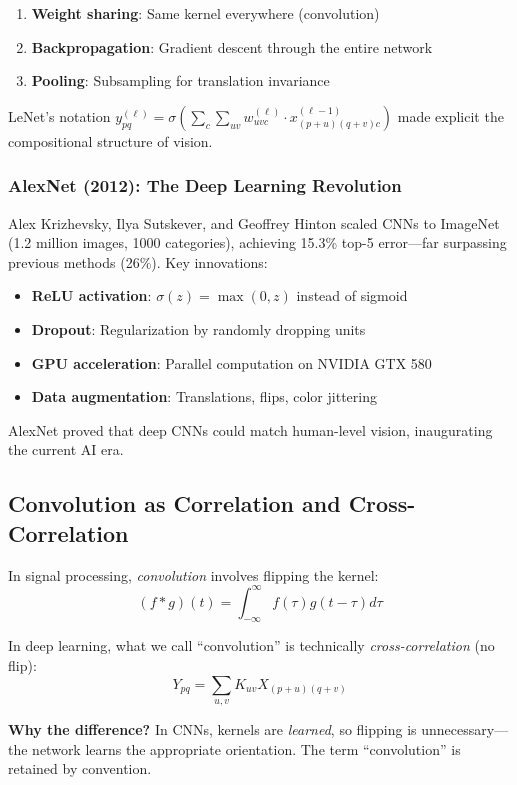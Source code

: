 \begin{enumerate}
	\item \textbf{Weight sharing}: Same kernel everywhere (convolution)
	\item \textbf{Backpropagation}: Gradient descent through the entire network
	\item \textbf{Pooling}: Subsampling for translation invariance
\end{enumerate}

LeNet's notation $y_{pq}^{(\ell)} = \sigma(\sum_c \sum_{uv} w_{uvc}^{(\ell)} \cdot x_{(p+u)(q+v)c}^{(\ell-1)})$ made explicit the compositional structure of vision.

\subsubsection{AlexNet (2012): The Deep Learning Revolution}

Alex Krizhevsky, Ilya Sutskever, and Geoffrey Hinton scaled CNNs to ImageNet (1.2 million images, 1000 categories), achieving 15.3\% top-5 error---far surpassing previous methods (26\%). Key innovations:

\begin{itemize}
	\item \textbf{ReLU activation}: $\sigma(z) = \max(0, z)$ instead of sigmoid
	\item \textbf{Dropout}: Regularization by randomly dropping units
	\item \textbf{GPU acceleration}: Parallel computation on NVIDIA GTX 580
	\item \textbf{Data augmentation}: Translations, flips, color jittering
\end{itemize}

AlexNet proved that deep CNNs could match human-level vision, inaugurating the current AI era.

\subsection{Convolution as Correlation and Cross-Correlation}

\begin{notation}
	In signal processing, \textit{convolution} involves flipping the kernel:
	\begin{equation}
		(f \ast g)(t) = \int_{-\infty}^\infty f(\tau) g(t - \tau) d\tau
	\end{equation}
	
	In deep learning, what we call ``convolution'' is technically \textit{cross-correlation} (no flip):
	\begin{equation}
		Y_{pq} = \sum_{u,v} K_{uv} X_{(p+u)(q+v)}
	\end{equation}
	
	\textbf{Why the difference?} In CNNs, kernels are \textit{learned}, so flipping is unnecessary---the network learns the appropriate orientation. The term ``convolution'' is retained by convention.
\end{notation}

